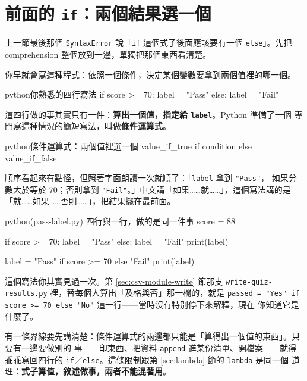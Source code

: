 \section{前面的 \texttt{if}：兩個結果選一個}
\label{sec:conditional-expression}

上一節最後那個 \texttt{SyntaxError} 說「\texttt{if} 這個式子後面應該要有一個
\texttt{else}」。先把 comprehension 整個放到一邊，單獨把那個東西看清楚。

你早就會寫這種程式：依照一個條件，決定某個變數要拿到兩個值裡的哪一個。

\begin{code}{python}{你熟悉的四行寫法}
if score >= 70:
    label = "Pass"
else:
    label = "Fail"
\end{code}

這四行做的事其實只有一件：\textbf{算出一個值，指定給 \texttt{label}}。Python 準備了一個
專門寫這種情況的簡短寫法，叫做\textbf{條件運算式}。

\begin{code}{python}{條件運算式：兩個值裡選一個}
value_if_true if condition else value_if_false
\end{code}

順序看起來有點怪，但照著字面朗讀一次就順了：「\texttt{label} 拿到 \texttt{"Pass"}，
如果分數大於等於 70；否則拿到 \texttt{"Fail"}。」中文講「如果……就……」，這個寫法講的是
「就……如果……否則……」，把結果擺在最前面。

\begin{example}{python}{(pass-label.py) 四行與一行，做的是同一件事}
score = 88

if score >= 70:
    label = "Pass"
else:
    label = "Fail"
print(label)

label = "Pass" if score >= 70 else "Fail"
print(label)
\end{example}


這個寫法你其實見過一次。第 \ref{sec:csv-module-write} 節那支
\texttt{write-quiz-results.py} 裡，替每個人算出「及格與否」那一欄的，就是
\texttt{passed = "Yes" if score >= 70 else "No"} 這一行——當時沒有特別停下來解釋，現在
你知道它是什麼了。

有一條界線要先講清楚：條件運算式的兩邊都只能是「算得出一個值的東西」。只要有一邊要做別的
事——印東西、把資料 \texttt{append} 進某份清單、開檔案——就得乖乖寫回四行的
\texttt{if}／\texttt{else}。這條限制跟第 \ref{sec:lambda} 節的 \texttt{lambda} 是同一個
道理：\textbf{式子算值，敘述做事，兩者不能混著用}。

